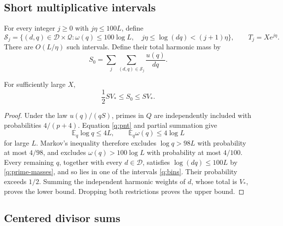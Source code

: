 \subsection{Short multiplicative intervals}

For every integer \(j\ge0\) with \(j\eta\le100L\), define
\begin{equation}\label{q:bins}
 \mathcal S_j=
 \{(d,q)\in\mathcal D\times\mathcal Q:
    \omega(q)\le100\log L,\quad
    j\eta\le\log(dq)<(j+1)\eta\},
 \qquad T_j=Xe^{j\eta}.
\end{equation}
There are \(O(L/\eta)\) such intervals. Define their total harmonic
mass by
\[
 S_0=\sum_j\sum_{(d,q)\in\mathcal S_j}\frac{u(q)}{dq}.
\]
\begin{lemma}\label{q:bin-mass}
For sufficiently large \(X\),
\[
 \frac12SV_*\le S_0\le SV_*.
\]
\end{lemma}
\begin{proof}
Under the law \(u(q)/(qS)\), primes in \(Q\) are independently
included with probabilities \(4/(p+4)\).
Equation \eqref{q:pnt} and partial summation give
\[
 \mathbb E_q\log q\le4L,\qquad
 \mathbb E_q\omega(q)\le4\log L
\]
for large \(L\). Markov's inequality therefore excludes
\(\log q>98L\) with probability at most \(4/98\), and excludes
\(\omega(q)>100\log L\) with probability at most \(4/100\).
Every remaining \(q\), together with every \(d\in\mathcal D\),
satisfies \(\log(dq)\le100L\) by \eqref{q:prime-masses}, and so lies
in one of the intervals \eqref{q:bins}. Their probability exceeds
\(1/2\). Summing the independent harmonic weights of \(d\), whose
total is \(V_*\), proves the lower bound. Dropping both restrictions
proves the upper bound.
\end{proof}

\subsection{Centered divisor sums}

